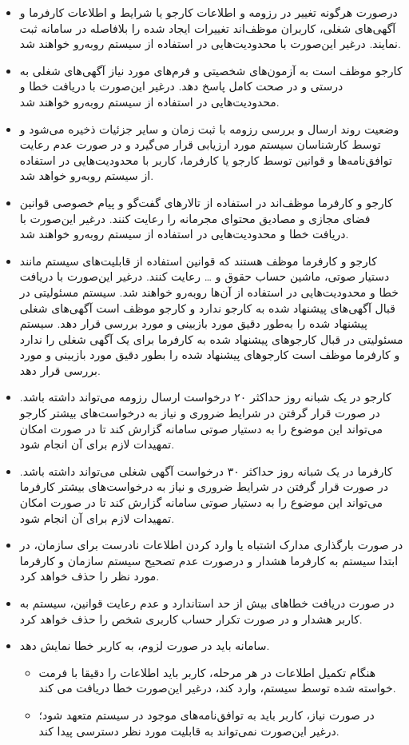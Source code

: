 \documentclass[12pt]{article}
\begin{document}
\begin{itemize}
		\item
		در‌صورت هرگونه تغییر در رزومه و اطلاعات کارجو یا شرایط و اطلاعات کارفرما و آگهی‌های شغلی، کاربران موظف‌اند تغییرات ایجاد شده را بلافاصله در سامانه ثبت نمایند. درغیر این‌صورت با محدودیت‌هایی در استفاده از سیستم روبه‌رو خواهند شد.
		\item
		کارجو موظف است به آزمون‌های شخصیتی و فرم‌های مورد نیاز آگهی‌های شغلی به درستی و در صحت کامل پاسخ دهد. درغیر این‌صورت با دریافت خطا و محدودیت‌هایی در استفاده از سیستم روبه‌رو خواهند شد.
		\item
		وضعیت روند ارسال و بررسی رزومه با ثبت زمان و سایر جزئیات ذخیره می‌شود و توسط کارشناسان سیستم مورد ارزیابی قرار می‌گیرد و در صورت عدم رعایت توافق‌نامه‌ها و قوانین توسط کارجو یا کارفرما، کاربر با محدودیت‌هایی در استفاده از سیستم روبه‌رو خواهد شد.
		\item
		کارجو و کارفرما موظف‌اند در استفاده از تالارهای گفت‌گو و پیام خصوصی قوانین فضای مجازی و مصادیق محتوای مجرمانه را رعایت کنند. درغیر این‌صورت با دریافت خطا و محدودیت‌هایی در استفاده از سیستم روبه‌‌رو خواهند شد.
		\item
		کارجو و کارفرما موظف هستند که قوانین استفاده از قابلیت‌های سیستم مانند دستیار صوتی، ماشین حساب حقوق و … رعایت کنند. درغیر این‌صورت با دریافت خطا و محدودیت‌هایی در استفاده از آن‌ها روبه‌رو خواهند شد.
		سیستم مسئولیتی در قبال آگهی‌های پیشنهاد شده به کارجو ندارد و کارجو موظف است آگهی‌های شغلی پیشنهاد شده را به‌طور دقیق مورد بازبینی و مورد بررسی قرار دهد.
		سیستم مسئولیتی در قبال کارجو‌های پیشنهاد شده به کارفرما برای یک آگهی شغلی را ندارد و کارفرما موظف است کارجو‌های پیشنهاد شده را بطور دقیق مورد بازبینی و مورد بررسی قرار دهد.
		\item
		کارجو در یک شبانه روز حداکثر ۲۰ درخواست ارسال رزومه می‌تواند داشته باشد. در‌ صورت قرار گرفتن در شرایط ضروری و نیاز به درخواست‌های بیشتر کارجو می‌تواند این موضوع را به دستیار صوتی سامانه گزارش کند تا در صورت امکان تمهیدات لازم برای آن انجام شود.
		\item
		کارفرما در یک شبانه روز حداکثر ۳۰ درخواست آگهی شغلی می‌تواند داشته باشد. در‌ صورت قرار گرفتن در شرایط ضروری و نیاز به درخواست‌های بیشتر کارفرما می‌تواند این موضوع را به دستیار صوتی سامانه گزارش کند تا در صورت امکان تمهیدات لازم برای آن انجام شود.
		\item
		در‌ صورت بارگذاری مدارک اشتباه یا وارد کردن اطلاعات نادرست برای سازمان، در ابتدا سیستم به کارفرما هشدار و درصورت عدم تصحیح سیستم سازمان و کارفرما مورد‌ نظر را حذف خواهد کرد.
		\item
		در صورت دریافت خطاهای بیش از حد استاندارد و عدم رعایت قوانین، سیستم به کاربر هشدار و در‌ صورت تکرار حساب کاربری شخص را حذف خواهد کرد.
		\item
		سامانه باید در صورت لزوم، به کاربر خطا نمایش دهد.
		\begin{itemize}
			\item
			هنگام تکمیل اطلاعات در هر مرحله، کاربر باید اطلاعات را دقیقا با فرمت خواسته شده توسط سیستم، وارد کند، درغیر این‌صورت خطا دریافت می کند.
			\item
			در صورت نیاز، کاربر باید به توافق‌نامه‌های موجود در سیستم متعهد شود؛ درغیر این‌صورت نمی‌تواند به قابلیت مورد نظر دسترسی پیدا کند.
		\end{itemize}
	\end{itemize}
\end{document}
